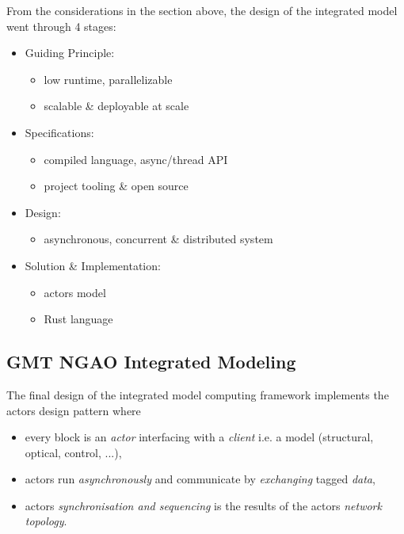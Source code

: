 \documentclass[]{AO4ELT}  %
\begin{document}
From the considerations in the section above, the design of the integrated model
went through 4 stages:
\begin{itemize}
   \item Guiding Principle:
         \begin{itemize}
            \item low runtime, parallelizable
            \item scalable \& deployable at scale
         \end{itemize}
   \item Specifications:
         \begin{itemize}
            \item compiled language, async/thread API
            \item project tooling \& open source
         \end{itemize}
   \item Design:
         \begin{itemize}
            \item asynchronous, concurrent
                  \& distributed system
         \end{itemize}
   \item Solution \& Implementation:
         \begin{itemize}
            \item actors model
            \item Rust language
         \end{itemize}
\end{itemize}

\subsection{GMT NGAO Integrated Modeling}
\label{sec:gmt-ngao-im}

The final design of the integrated model computing framework implements the actors design pattern where
\begin{itemize}
   \item every block is an \emph{actor} interfacing with a \emph{client} i.e. a model (structural, optical, control, ...),
   \item actors run \emph{asynchronously} and communicate by \emph{exchanging} tagged \emph{data},
   \item actors \emph{synchronisation and sequencing} is the results of the actors \emph{network topology}.
\end{itemize}
\end{document}
